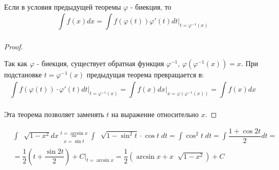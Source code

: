 \documentclass[../main.tex]{subfiles}
\begin{document}
\begin{crl}
    Если в условия предыдущей теоремы \( \varphi \) - биекция, то 
    \[ \displaystyle\int\limits_{ }^{ } f\left( x\right)dx= \displaystyle\int\limits_{ }^{ } f\left( \varphi \left( t\right)\right) \varphi '\left( t\right)dt\bigg|_{t= \varphi ^{-1}\left( x\right)}\]
\end{crl}
\begin{proof}
    
    ~

    Так как \( \varphi \) - биекция, существует обратная функция \( \varphi ^{-1}\), \( \varphi \left( \varphi ^{-1}\left( x\right)\right)=x\). При подстановке \( t = \varphi ^{-1}\left( x\right)\) предыдущая теорема превращается в:
    \[ \displaystyle\int\limits_{ }^{ } f\left( \varphi \left( t\right)\right) \cdot \varphi '\left( t\right)dt\bigg|_{t= \varphi ^{-1}\left( x\right)}= \displaystyle\int\limits_{ }^{ } f\left( x\right)dx\bigg|_{x= \varphi \left( \varphi ^{-1}\left( x\right)\right)}= \displaystyle\int\limits_{ }^{ } f\left( x\right)dx\]

    Эта теорема позволяет заменять \( t\) на выражение относительно \( x\).
\end{proof}

\begin{example}
    \begin{equation*}
        \begin{aligned}
            &\displaystyle\int\limits_{ }^{ } \;\sqrt[]{1-x^2}dx\underset{x=\sin t}{\overset{t=\arcsin x}{=}} \displaystyle\int\limits_{ }^{ } \;\sqrt[]{1-\sin^2t} \cdot \cos t\;dt= \displaystyle\int\limits_{ }^{ } \cos ^2t\;dt= \displaystyle\int\limits_{ }^{ } \dfrac{ 1+\cos2t}{ 2} dt=\\
            &= \dfrac{ 1}{ 2} \left( t+ \dfrac{ \sin2t}{ 2} \right)+C\bigg|_{t=\arcsin x}= \dfrac{ 1}{ 2} \left( \arcsin x+ x \;\sqrt[]{1-x^2}\right)+C
        \end{aligned}
    \end{equation*}
\end{example}
\end{document}
